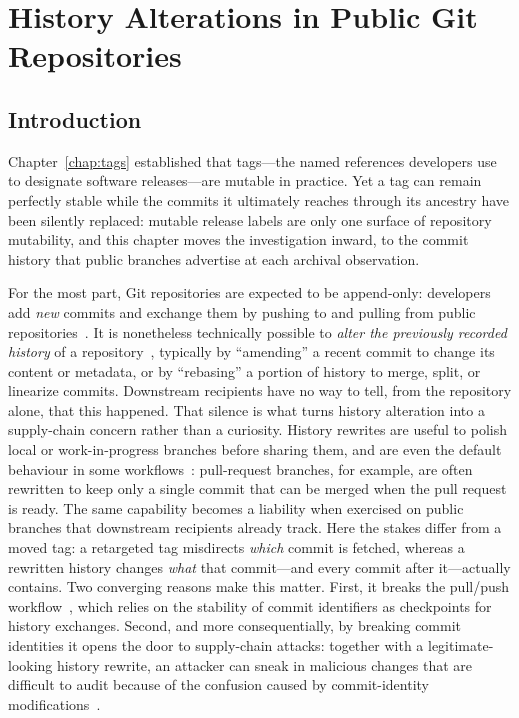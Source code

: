 %
%
\chapter{History Alterations in Public Git Repositories}
\label{chap:histories}

\section{Introduction}
\label{sec:hist-intro}

Chapter~\ref{chap:tags} established that tags---the named references developers use to designate software releases---are mutable in practice.
Yet a tag can remain perfectly stable while the commits it ultimately reaches through its ancestry have been silently replaced: mutable release labels are only one surface of repository mutability, and this chapter moves the investigation inward, to the commit history that public branches advertise at each archival observation.

For the most part, Git repositories are expected to be append-only: developers add \emph{new} commits and exchange them by pushing to and pulling from public repositories~\cite{ProGit2014}.
It is nonetheless technically possible to \emph{alter the previously recorded history} of a repository~\cite[Chapter 7.6, Rewriting History]{ProGit2014}, typically by ``amending'' a recent commit to change its content or metadata, or by ``rebasing'' a portion of history to merge, split, or linearize commits.
Downstream recipients have no way to tell, from the repository alone, that this happened.
That silence is what turns history alteration into a supply-chain concern rather than a curiosity.
History rewrites are useful to polish local or work-in-progress branches before sharing them, and are even the default behaviour in some workflows~\cite{DBLP:journals/infsof/RiosEE22}: pull-request branches, for example, are often rewritten to keep only a single commit that can be merged when the pull request is ready.
The same capability becomes a liability when exercised on public branches that downstream recipients already track.
Here the stakes differ from a moved tag: a retargeted tag misdirects \emph{which} commit is fetched, whereas a rewritten history changes \emph{what} that commit---and every commit after it---actually contains.
Two converging reasons make this matter.
First, it breaks the pull/push workflow~\cite{DBLP:conf/issre/JiCYM20}, which relies on the stability of commit identifiers as checkpoints for history exchanges.
Second, and more consequentially, by breaking commit identities it opens the door to supply-chain attacks: together with a legitimate-looking history rewrite, an attacker can sneak in malicious changes that are difficult to audit because of the confusion caused by commit-identity modifications~\cite{ladisa2023supplychain,torresarias2016gitmetadata}.

